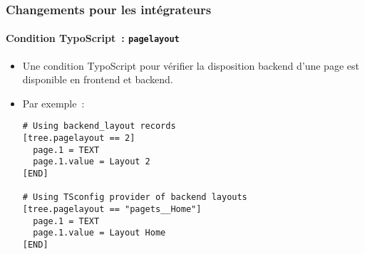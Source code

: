 %

\begin{frame}[fragile]
	\frametitle{Changements pour les intégrateurs}
	\framesubtitle{Condition TypoScript~: \texttt{pagelayout}}

	\lstset{basicstyle=\tiny\ttfamily}

	\begin{itemize}
		\item Une condition TypoScript pour vérifier la disposition backend d'une page
			est disponible en frontend et backend.
		\item Par exemple~:
\begin{lstlisting}
# Using backend_layout records
[tree.pagelayout == 2]
  page.1 = TEXT
  page.1.value = Layout 2
[END]

# Using TSconfig provider of backend layouts
[tree.pagelayout == "pagets__Home"]
  page.1 = TEXT
  page.1.value = Layout Home
[END]
\end{lstlisting}

	\end{itemize}
\end{frame}

